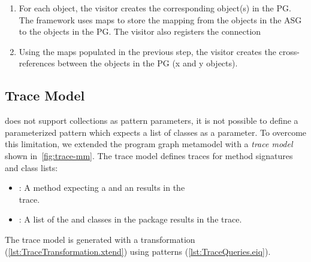 \documentclass[submission,copyright,creativecommons]{eptcs}
\begin{document}
\begin{enumerate}[noitemsep]
\item For each object, the visitor creates the corresponding object(s) in the PG. The framework uses maps to store the mapping from the objects in the ASG to the objects in the PG. The visitor also registers the connection 


\item Using the maps populated in the previous step, the visitor creates the cross-references between the objects in the PG (\eg x and y objects).
\end{enumerate}

\subsection{Trace Model}


\eiq does not support collections as pattern parameters, \eg it is not possible to define a parameterized pattern which expects a list of classes as a parameter. To overcome this limitation, we extended the program graph metamodel with a \emph{trace model} shown in~\autoref{fig:trace-mm}. The trace model defines traces for method signatures and class lists:

\begin{itemize}[noitemsep]
\item {}: A method  expecting a  and an  results in the \\  trace.
\item {}: A list of the  and  classes in the  package results in the  trace.
\end{itemize}

The trace model is generated with a \viatra transformation (\autoref{lst:TraceTransformation.xtend}) using \eiq patterns (\autoref{lst:TraceQueries.eiq}).
\end{document}
